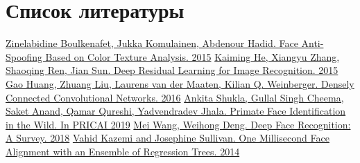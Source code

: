\documentclass[a4paper,14pt]{extarticle}
\begin{document}
    \section{Список литературы}
    \renewcommand{\section}[2]{}
    \begin{thebibliography}{0}
        \hypertarget{lpb}{}
        \href{https://arxiv.org/abs/1511.06316}
        {Zinelabidine Boulkenafet, Jukka Komulainen, Abdenour Hadid. Face Anti-Spoofing Based on Color Texture Analysis. 2015}
        \hypertarget{resnet}{}
        \href{https://arxiv.org/abs/1512.03385}
        {Kaiming He, Xiangyu Zhang, Shaoqing Ren, Jian Sun. Deep Residual Learning for Image Recognition. 2015}
        \hypertarget{densenet}{}
        \href{https://arxiv.org/abs/1608.06993}
        {Gao Huang, Zhuang Liu, Laurens van der Maaten, Kilian Q. Weinberger. Densely Connected Convolutional Networks. 2016}
        \hypertarget{pfid}{}
        \href{https://arxiv.org/abs/1907.02642}
        {Ankita Shukla, Gullal Singh Cheema, Saket Anand, Qamar Qureshi, Yadvendradev Jhala. Primate Face Identification in the Wild. In PRICAI 2019}
        \hypertarget{face}{}
        \href{https://arxiv.org/abs/1804.06655}
        {Mei Wang, Weihong Deng. Deep Face Recognition: A Survey. 2018}
        \hypertarget{align}{}
        \href{http://www.csc.kth.se/~vahidk/papers/KazemiCVPR14.pdf}
        {Vahid Kazemi and Josephine Sullivan. One Millisecond Face Alignment with an Ensemble of Regression Trees. 2014}
    \end{thebibliography}
\end{document}
